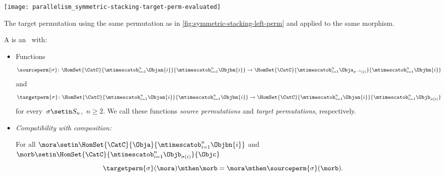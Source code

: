 \begin{marginfigure}
    \centering
    \texttt{[image: parallelism\_symmetric-stacking-target-perm-evaluated]}
    \caption{The target permutation using the same permutation as in \cref{fig:symmetric-stacking-left-perm} and applied to the same morphism.}
    \label{fig:symmetric-stacking-target-perm}
\end{marginfigure}

\begin{ctdefinition}
    \label{def:symmetric-stacking-category}
    A  is an   ~\CatC with:

    \constit

    \begin{itemize}
        \item Functions
              \begin{equation}
                  \sourceperm{\sigma} \colon \HomSet{\CatC}{\mtimescatob_{i=1}^n \Objan{i}}{\mtimescatob_{i=1}^n \Objbn{i}} \to \HomSet{\CatC}{\mtimescatob_{i=1}^n \Obja_{\sigma^{-1}(i)}}{\mtimescatob_{i=1}^n \Objbn{i}}
              \end{equation}
              and
              \begin{equation}
                  \targetperm{\sigma} \colon \HomSet{\CatC}{\mtimescatob_{i=1}^n \Objan{i}}{\mtimescatob_{i=1}^n \Objbn{i}} \to \HomSet{\CatC}{\mtimescatob_{i=1}^n \Objan{i}}{\mtimescatob_{i=1}^n \Objb_{\sigma(i)}}
              \end{equation}
              for every~$\sigma \setin S_n$,~$n \geq 2$.
              We call these functions \emph{source permutations} and \emph{target permutations}, respectively.
    \end{itemize}

    \condit

    \begin{itemize}

        \item \emph{Compatibility with composition:}

              For all $\mora \setin \HomSet{\CatC}{\Obja}{\mtimescatob_{i=1}^n \Objbn{i}}$ and $\morb \setin \HomSet{\CatC}{\mtimescatob_{i=1}^n \Objb_{\sigma(i)}}{\Objc}$
              \begin{equation}
                  \label{eq:perm-compatibility-with-composition}
                  \targetperm{\sigma} (\mora) \mthen \morb = \mora \mthen \sourceperm{\sigma}(\morb).
              \end{equation}


\end{itemize}
\end{ctdefinition}
